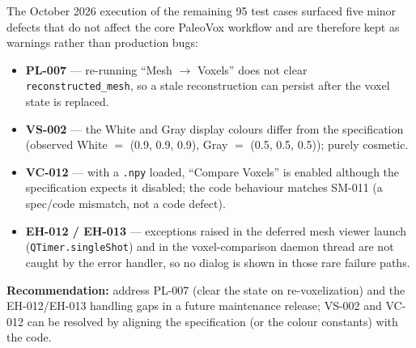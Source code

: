 \documentclass[12pt,a4paper]{article}
\begin{document}
The October 2026 execution of the remaining 95 test cases surfaced five minor
defects that do not affect the core PaleoVox workflow and are therefore kept as
warnings rather than production bugs:

\begin{itemize}
  \item \textbf{PL-007} --- re-running ``Mesh $\rightarrow$ Voxels'' does not
        clear \texttt{reconstructed\_mesh}, so a stale reconstruction can
        persist after the voxel state is replaced.
  \item \textbf{VS-002} --- the White and Gray display colours differ from the
        specification (observed White $=$ (0.9, 0.9, 0.9), Gray $=$
        (0.5, 0.5, 0.5)); purely cosmetic.
  \item \textbf{VC-012} --- with a \texttt{.npy} loaded, ``Compare Voxels'' is
        enabled although the specification expects it disabled; the code
        behaviour matches SM-011 (a spec/code mismatch, not a code defect).
  \item \textbf{EH-012 / EH-013} --- exceptions raised in the deferred mesh
        viewer launch (\texttt{QTimer.singleShot}) and in the voxel-comparison
        daemon thread are not caught by the error handler, so no dialog is shown
        in those rare failure paths.
\end{itemize}

\textbf{Recommendation:} address PL-007 (clear the state on re-voxelization) and
the EH-012/EH-013 handling gaps in a future maintenance release; VS-002 and
VC-012 can be resolved by aligning the specification (or the colour constants)
with the code.
\end{document}
